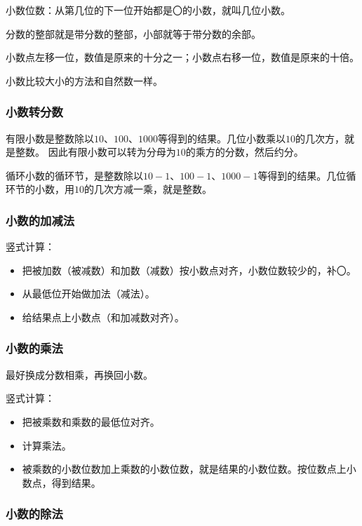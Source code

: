\documentclass[12pt,UTF8]{ctexbook}
\begin{document}
小数位数：从第几位的下一位开始都是〇的小数，就叫几位小数。

分数的整部就是带分数的整部，小部就等于带分数的余部。

小数点左移一位，数值是原来的十分之一；小数点右移一位，数值是原来的十倍。

小数比较大小的方法和自然数一样。

\subsubsection{小数转分数}

有限小数是整数除以\( 10 \)、\( 100 \)、\( 1000 \)等得到的结果。几位小数乘以\( 10 \)的几次方，就是整数。
因此有限小数可以转为分母为\( 10 \)的乘方的分数，然后约分。

循环小数的循环节，是整数除以\( 10-1 \)、\( 100-1 \)、\( 1000-1 \)等得到的结果。几位循环节的小数，用\( 10 \)的几次方减一乘，就是整数。

\subsubsection{小数的加减法}

竖式计算：

\begin{itemize}
\item 把被加数（被减数）和加数（减数）按小数点对齐，小数位数较少的，补〇。
\item 从最低位开始做加法（减法）。
\item 给结果点上小数点（和加减数对齐）。
\end{itemize}

\subsubsection{小数的乘法}

最好换成分数相乘，再换回小数。

竖式计算：

\begin{itemize}
\item 把被乘数和乘数的最低位对齐。
\item 计算乘法。
\item 被乘数的小数位数加上乘数的小数位数，就是结果的小数位数。按位数点上小数点，得到结果。
\end{itemize}

\subsubsection{小数的除法}
\end{document}
